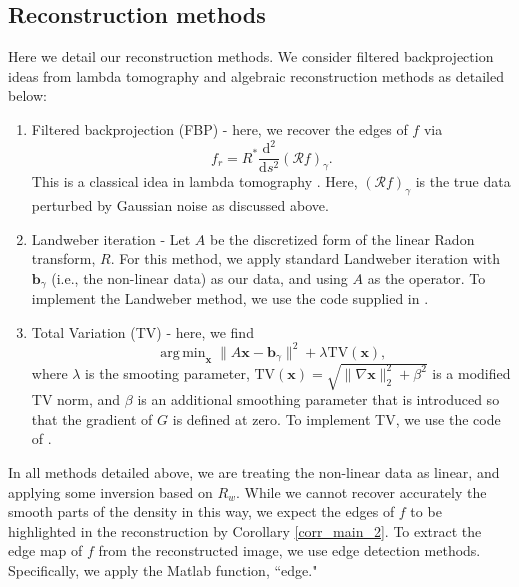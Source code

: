 \documentclass[a4paper,12pt]{amsart}
\numberwithin{equation}{section}
\theoremstyle{plain}
\numberwithin{theorem}{section}
\theoremstyle{definition}
\theoremstyle{remark}
\theoremstyle{remark}
\theoremstyle{remark}
\newcommand{\vb}{\mathbf{b}}
\newcommand{\vx}{{\mathbf{x}}}
\DeclareMathOperator*{\argmin}{arg\,min}
\begin{document}
\subsection{Reconstruction methods}
\label{rec_mthds}
Here we detail our reconstruction methods. We consider filtered backprojection ideas from lambda tomography and algebraic reconstruction methods as detailed below:
\begin{enumerate}
\item Filtered backprojection (FBP) - here, we recover the edges of $f$ via
\begin{equation}
f_r = R^* \frac{\mathrm{d}^2}{\mathrm{d}s^2} (\mathcal{R}f)_\gamma.
\end{equation}
This is a classical idea in lambda tomography \cite{quinto2009electron}. Here, $(\mathcal{R}f)_\gamma$ is the true data perturbed by Gaussian noise as discussed above.
\item Landweber iteration  - Let $A$ be the discretized form of the linear Radon transform, $R$. For this method, we apply standard Landweber iteration \cite{landweber1951iteration}  with $\vb_\gamma$ (i.e., the non-linear data) as our data, and using $A$ as the operator. To implement the Landweber method, we use the code supplied in \cite{AIRtools}.
\item Total Variation (TV) -  here, we find
\begin{equation}
\label{solve}
\argmin_{\vx} \|A\vx - \vb_\gamma\|^2 + \lambda \text{TV}(\vx),
\end{equation}
where $\lambda$ is the smooting parameter, $\text{TV}(\vx) = \sqrt{\|\nabla\vx\|_2^2 + \beta^2}$ is a modified TV norm, and $\beta$ is an additional smoothing parameter that is introduced so that the gradient of $G$ is defined at zero. To implement TV, we use the code of \cite{ehrhardt2014joint}.
\end{enumerate}
In all methods detailed above, we are treating the non-linear data as linear, and applying some inversion based on $R_w$. While we cannot recover accurately the smooth parts of the density in this way, we expect the edges of $f$ to be highlighted in the reconstruction by Corollary \ref{corr_main_2}. To extract the edge map of $f$ from the reconstructed image, we use edge detection methods. Specifically, we apply the Matlab function, ``edge."
\end{document}
